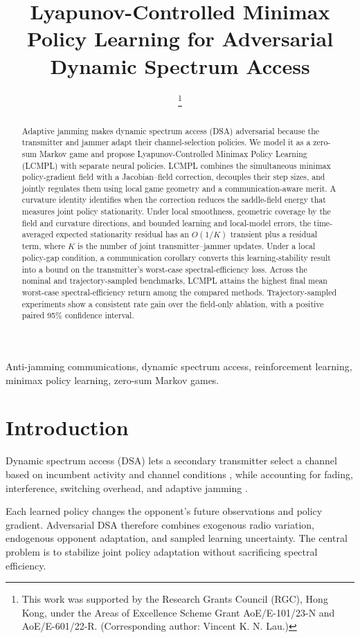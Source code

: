 \documentclass[conference]{IEEEtran}
\title{Lyapunov-Controlled Minimax Policy Learning for Adversarial Dynamic Spectrum Access}
\author{
\IEEEauthorblockN{Jialin Zhuang and Vincent K. N. Lau}
\IEEEauthorblockA{Department of Electronic and Computer Engineering, The Hong Kong University of Science and Technology\\
Hong Kong SAR, China; Emails: jzhuangag@connect.ust.hk; eeknlau@ece.ust.hk}
\thanks{This work was supported by the Research Grants Council (RGC), Hong Kong, under the Areas of Excellence Scheme Grant AoE/E-101/23-N and AoE/E-601/22-R.
(Corresponding author: Vincent K. N. Lau.)}
}
\begin{document}
\maketitle

\begin{abstract}
Adaptive jamming makes dynamic spectrum access (DSA) adversarial because the transmitter and jammer adapt their channel-selection policies.
We model it as a zero-sum Markov game and propose Lyapunov-Controlled Minimax Policy Learning (LCMPL) with separate neural policies.
LCMPL combines the simultaneous minimax policy-gradient field with a Jacobian--field correction, decouples their step sizes, and jointly regulates them using local game geometry and a communication-aware merit.
A curvature identity identifies when the correction reduces the saddle-field energy that measures joint policy stationarity.
Under local smoothness, geometric coverage by the field and curvature directions, and bounded learning and local-model errors, the time-averaged expected stationarity residual has an $O(1/K)$ transient plus a residual term, where $K$ is the number of joint transmitter--jammer updates.
Under a local policy-gap condition, a communication corollary converts this learning-stability result into a bound on the transmitter's worst-case spectral-efficiency loss.
Across the nominal and trajectory-sampled benchmarks, LCMPL attains the highest final mean worst-case spectral-efficiency return among the compared methods.
Trajectory-sampled experiments show a consistent rate gain over the field-only ablation, with a positive paired 95\% confidence interval.
\end{abstract}

\begin{IEEEkeywords}
Anti-jamming communications, dynamic spectrum access, reinforcement learning, minimax policy learning, zero-sum Markov games.
\end{IEEEkeywords}

\section{Introduction}
Dynamic spectrum access (DSA) lets a secondary transmitter select a channel based on incumbent activity and channel conditions \cite{Zhao2008Myopic}, while accounting for fading, interference, switching overhead, and adaptive jamming \cite{Naparstek2019DeepDSA,Liu2018SpectrumWaterfall,Wang2020AntiJammingSurvey}.

Each learned policy changes the opponent's future observations and policy gradient.
Adversarial DSA therefore combines exogenous radio variation, endogenous opponent adaptation, and sampled learning uncertainty.
The central problem is to stabilize joint policy adaptation without sacrificing spectral efficiency.
\end{document}
